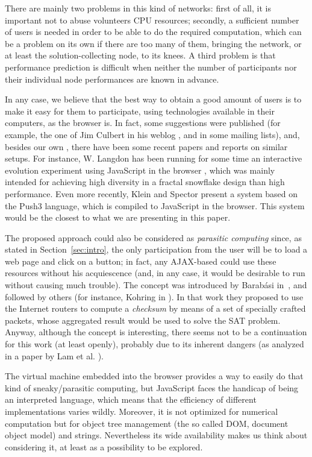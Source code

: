 \documentclass{llncs}
\begin{document}
There are mainly two problems in this kind of networks: first of all,
it is important not to abuse volunteers CPU resources; secondly, a
sufficient number of users is needed in order to be able to do the
required computation, which can be a problem on its own if there are
too many of them, bringing the network, or at least the
solution-collecting node, to its knees. A third problem is that
performance prediction is difficult when neither the number of
participants nor their individual node performances are known in
advance.

In any case, we believe that the best way to obtain a good amount of
users is to make it easy for them to participate, using technologies
available in their computers, as the browser is. In fact, some
suggestions were published (for example, the one of Jim Culbert in his
weblog \cite{ajax:dc}, and in some mailing lists), and, besides our
own \cite{gecco07:workshop:dcor}, there have been some recent papers
and reports on similar setups. For instance, W. Langdon has been
running for some time an interactive evolution experiment using
JavaScript in the browser \cite{langdon:2005:metas}, which was mainly
intended for achieving high diversity in a fractal snowflake design
than high performance. Even more recently, Klein and Spector
\cite{unwitting-ec} present a system based on the Push3 language,
which is compiled to JavaScript in the browser. This system would be
the closest to what we are presenting in this paper. 

The proposed approach could also be considered as {\em parasitic
computing} since, as stated in Section~\ref{sec:intro}, the only
participation from the user will be to load a web page and click on a
button; in fact, any AJAX-based could use these resources without his
acquiescence (and, in any case, it would be desirable to run without
causing much trouble).  The concept was introduced by Barab\'asi
in~\cite{Barabasi2001Parasitic}, and followed by others (for instance,
Kohring in \cite{kohring-2003-14}).  In that work they proposed to use
the Internet routers to compute a {\em checksum} by means of a set of
specially crafted packets, whose aggregated result would be used to
solve the SAT problem. Anyway, although the concept is interesting,
there seems not to be a continuation for this work (at least openly),
probably due to its inherent dangers (as analyzed in a paper by Lam et
al.  \cite{puppetnets}).

The virtual machine embedded into the browser provides a way to easily
do that kind of  sneaky/parasitic computing, but JavaScript faces the
handicap of being an interpreted language, which means that the efficiency of different
implementations varies wildly. Moreover, it is not optimized for
numerical computation but for object tree 
management (the so called DOM, document
object model) and strings.
Nevertheless its wide availability makes us think about considering it, at
least as a possibility to be explored.
\end{document}
